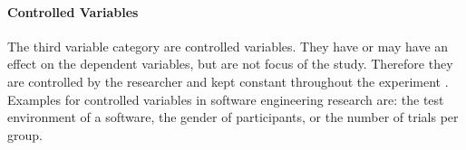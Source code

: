 
\paragraph{Controlled Variables}

The third variable category are controlled variables. They have or may have an effect on the dependent variables, but are not focus of the study. Therefore they are controlled by the researcher and kept constant throughout the experiment \cite{BuddiesVariables}. Examples for controlled variables in software engineering research are: the test environment of a software, the gender of participants, or the number of trials per group.